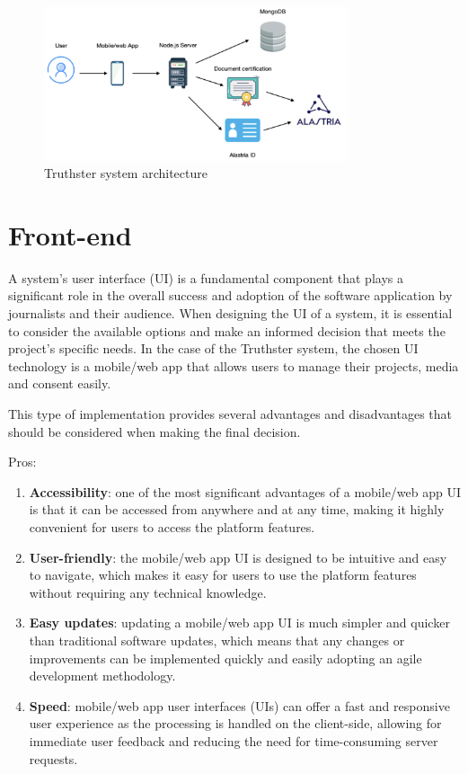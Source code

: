 \documentclass[target=mst,aauheader=]{thud}
\begin{document}
\begin{figure}
    \centering
    \includegraphics[width=0.8\textwidth]{images/technicalArchitectureStructuralView.png}
    \caption{Truthster system architecture}
    \label{fig:truthsterArchitecture}
\end{figure}


\section{Front-end}

A system's user interface (UI) is a fundamental component that plays a significant role in the overall success and adoption of the software application by journalists and their audience. When designing the UI of a system, it is essential to consider the available options and make an informed decision that meets the project's specific needs.
In the case of the Truthster system, the chosen UI technology is a mobile/web app that allows users to manage their projects, media and consent easily.

This type of implementation provides several advantages and disadvantages that should be considered when making the final decision.

Pros:

\begin{enumerate}

    \item \textbf{Accessibility}: one of the most significant advantages of a mobile/web app UI is that it can be accessed from anywhere and at any time, making it highly convenient for users to access the platform features.
    \item \textbf{User-friendly}: the mobile/web app UI is designed to be intuitive and easy to navigate, which makes it easy for users to use the platform features without requiring any technical knowledge.
    \item \textbf{Easy updates}: updating a mobile/web app UI is much simpler and quicker than traditional software updates, which means that any changes or improvements can be implemented quickly and easily adopting an agile development methodology.
    \item \textbf{Speed}: mobile/web app user interfaces (UIs) can offer a fast and responsive user experience as the processing is handled on the client-side, allowing for immediate user feedback and reducing the need for time-consuming server requests.

\end{enumerate}
\end{document}
